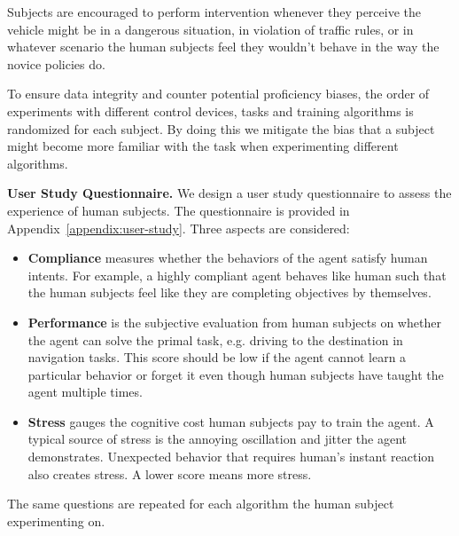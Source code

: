 Subjects are encouraged to perform intervention whenever they perceive the vehicle might be in a dangerous situation, in violation of traffic rules, or in whatever scenario the human subjects feel they wouldn't behave in the way the novice policies do. 

To ensure data integrity and counter potential proficiency biases, the order of experiments with different control devices, tasks and training algorithms is randomized for each subject. By doing this we mitigate the bias that a subject might become more familiar with the task when experimenting different algorithms.


\textbf{User Study Questionnaire.}
We design a user study questionnaire to assess the experience of human subjects. The questionnaire is provided in Appendix~\ref{appendix:user-study}. Three aspects are considered:
\begin{itemize}
[leftmargin=1em,topsep=0pt,itemsep=-0.3em]
\item
\textbf{Compliance} measures whether the behaviors of the agent satisfy human intents. For example, a highly compliant agent behaves like human such that the human subjects feel like they are completing objectives by themselves.
\item
\textbf{Performance} is the subjective evaluation from human subjects on whether the agent can solve the primal task, e.g. driving to the destination in navigation tasks. This score should be low if the agent cannot learn a particular behavior or forget it even though human subjects have taught the agent multiple times.
\item
\textbf{Stress} gauges the cognitive cost human subjects pay to train the agent. A typical source of stress is the annoying oscillation and jitter the agent demonstrates. Unexpected behavior that requires human's instant reaction also creates stress. A lower score means more stress.
\end{itemize}


The same questions are repeated for each algorithm the human subject experimenting on.

